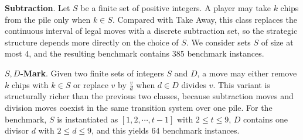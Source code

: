 \documentclass[review]{elsarticle}
\newcommand{\set}[1]{\{ #1 \}}
\newcommand{\tuple}[1]{\langle {#1} \rangle}
\newcommand{\true}{\top}
\newcommand{\statevar}{\mathcal{X}}
\newcommand{\act}{\mathcal{A}}
\newcommand{\constraint}{\mathcal{C}}
\newcommand{\estate}{\mathcal{E}}
\newcommand{\pre}{\mathtt{pre}}
\newcommand{\eff}{\mathtt{eff}}
\begin{document}
{\color{red}\textbf{Subtraction}. Let $S$ be a finite set of positive integers.}
{\color{red}A player may take $k$ chips from the pile only when $k \in S$.}
{\color{red}Compared with Take Away, this class replaces the continuous interval of legal moves with a discrete subtraction set, so the strategic structure depends more directly on the choice of $S$.}
{\color{red}We consider sets $S$ of size at most $4$, and the resulting benchmark contains $385$ benchmark instances.}

{\color{red}\textbf{$S,D$-Mark}. Given two finite sets of integers $S$ and $D$, a move may either remove $k$ chips with $k \in S$ or replace $v$ by $\frac{v}{d}$ when $d \in D$ divides $v$.}
{\color{red}This variant is structurally richer than the previous two classes, because subtraction moves and division moves coexist in the same transition system over one pile.}
{\color{red}For the benchmark, $S$ is instantiated as $[1,2,\cdots,t-1]$ with $2 \le t \le 9$, $D$ contains one divisor $d$ with $2 \le d \le 9$, and this yields $64$ benchmark instances.}
\end{document}
